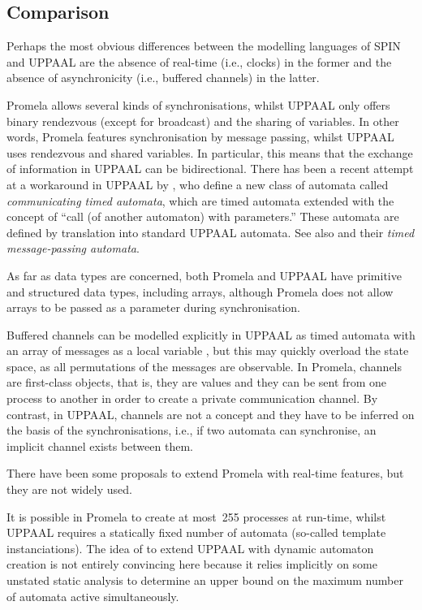 \documentclass[a4paper,11pt,twoside]{article}
\newcommand\SPIN{\textsf{SPIN}\xspace}
\newcommand\Promela{\textsf{Promela}\xspace}
\newcommand\UPPAAL{\textsf{UPPAAL}\xspace}
\begin{document}
\subsection{Comparison}

Perhaps the most obvious differences between the modelling languages
of \SPIN and \UPPAAL are the absence of real\hyp{}time (i.e., clocks)
in the former and the absence of asynchronicity (i.e., buffered
channels) in the latter. 

\Promela allows several kinds of synchronisations, whilst \UPPAAL only
offers binary rendezvous (except for broadcast) and the sharing of
variables. In other words, \Promela features synchronisation by
message passing, whilst \UPPAAL uses rendezvous and shared
variables. In particular, this means that the exchange of information
in \UPPAAL can be bidirectional. There has been a recent attempt at a
workaround in \UPPAAL by \citet{Boudjadar_et_al:2013}, who define a
new class of automata called \emph{communicating timed automata},
which are timed automata extended with the concept of ``call (of
another automaton) with parameters.'' These automata are defined by
translation into standard \UPPAAL automata. See also
\citet{ChandrasekaranMukund:2006} and their \emph{timed
  message\hyp{}passing automata}.

As far as data types are concerned, both \Promela and \UPPAAL have
primitive and structured data types, including arrays, although
\Promela does not allow arrays to be passed as a parameter during
synchronisation.

Buffered channels can be modelled explicitly in \UPPAAL as timed
automata with an array of messages as a local variable
\citep{ChandrasekaranMukund:2006}, but this may quickly overload the
state space, as all permutations of the messages are observable. In \Promela, channels are first\hyp{}class objects, that is, they are
values and they can be sent from one process to another in order to
create a private communication channel. By contrast, in \UPPAAL,
channels are not a concept and they have to be inferred on the basis
of the synchronisations, i.e., if two automata can synchronise, an
implicit channel exists between them.

There have been some proposals
\citep{TripakisCourcoubetis:1996,Bosnacki:2002,NabialekJanowskaJanowski:2008}
to extend \Promela with real\hyp{}time features, but they are not
widely used.

It is possible in \Promela to create at most~255 processes at
run\hyp{}time, whilst \UPPAAL requires a statically fixed number of
automata (so\hyp{}called template instanciations). The idea of
\citet{Boudjadar_et_al:2013} to extend \UPPAAL with dynamic automaton
creation is not entirely convincing here because it relies implicitly
on some unstated static analysis to determine an upper bound on the
maximum number of automata active simultaneously.
\end{document}

